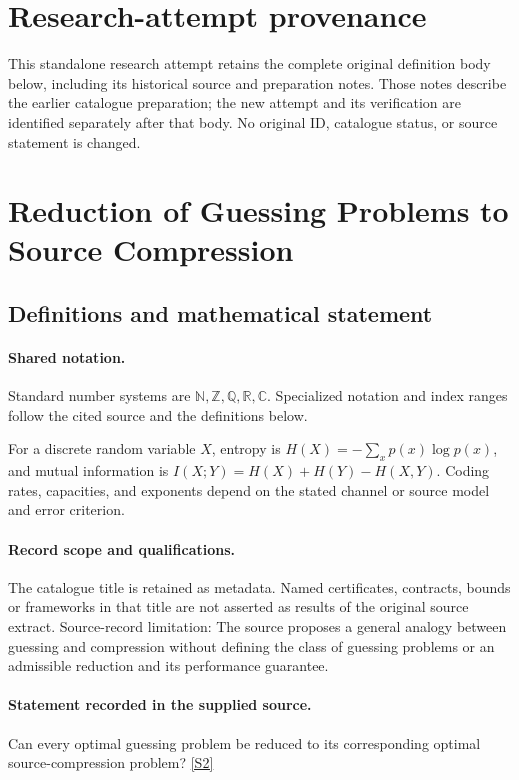 \documentclass[11pt]{article}
\begin{document}
\section*{Research-attempt provenance}
This standalone research attempt retains the complete original definition body below,
including its historical source and preparation notes. Those notes describe the
earlier catalogue preparation; the new attempt and its verification are identified
separately after that body. No original ID, catalogue status, or source statement is changed.

\section{Reduction of Guessing Problems to Source Compression}\label{statement}

\subsection{Definitions and mathematical statement}

\paragraph{Shared notation.}Standard number systems are $\mathbb N,\mathbb Z,\mathbb Q,\mathbb R,\mathbb C$. Specialized notation and index ranges follow the cited source and the definitions below.


For a discrete random variable $X$, entropy is $H(X)=-\sum_xp(x)\log p(x)$, and mutual information is $I(X;Y)=H(X)+H(Y)-H(X,Y)$. Coding rates, capacities, and exponents depend on the stated channel or source model and error criterion.
\paragraph{Record scope and qualifications.}
The catalogue title is retained as metadata. Named certificates, contracts, bounds or frameworks in that title are not asserted as results of the original source extract.
Source-record limitation: The source proposes a general analogy between guessing and compression without defining the class of guessing problems or an admissible reduction and its performance guarantee.
\paragraph{Statement recorded in the supplied source.}
Can every optimal guessing problem be reduced to its corresponding optimal source-compression problem? \href{https://doi.org/10.4171/owr/2022/14}{[S2]}
\end{document}
